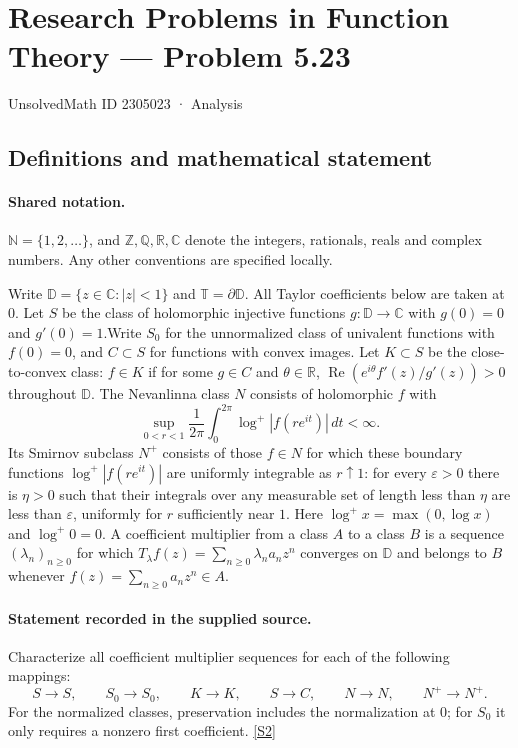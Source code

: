 \documentclass[11pt]{article}
\newcommand{\sref}[2]{\hyperlink{source:#1:#2}{[S#2]}}
\begin{document}
\setcounter{section}{2305022}
\section{Research Problems in Function Theory — Problem 5.23}\label{2305023}
{\small\sffamily UnsolvedMath ID 2305023 · Analysis}
\subsection{Definitions and mathematical statement}

\paragraph{Shared notation.}$\mathbb N=\{1,2,\ldots\}$, and $\mathbb Z,\mathbb Q,\mathbb R,\mathbb C$ denote the integers, rationals, reals and complex numbers. Any other conventions are specified locally.


Write $\mathbb D=\{z\in\mathbb C:|z|<1\}$ and $\mathbb T=\partial\mathbb D$. All Taylor coefficients below are taken at $0$. Let $S$ be the class of holomorphic injective functions $g:\mathbb D\to\mathbb C$ with $g(0)=0$ and $g'(0)=1$.Write $S_0$ for the unnormalized class of univalent functions with $f(0)=0$, and $C\subset S$ for functions with convex images. Let $K\subset S$ be the close-to-convex class: $f\in K$ if for some $g\in C$ and $\theta\in\mathbb R$, $\operatorname{Re}(e^{i\theta}f'(z)/g'(z))>0$ throughout $\mathbb D$. The Nevanlinna class $N$ consists of holomorphic $f$ with
\[\sup_{0<r<1}\frac1{2\pi}\int_0^{2\pi}\log^+|f(re^{it})|\,dt<\infty.
\]
Its Smirnov subclass $N^+$ consists of those $f\in N$ for which these boundary functions $\log^+|f(re^{it})|$ are uniformly integrable as $r\uparrow1$: for every $\varepsilon>0$ there is $\eta>0$ such that their integrals over any measurable set of length less than $\eta$ are less than $\varepsilon$, uniformly for $r$ sufficiently near $1$. Here $\log^+x=\max(0,\log x)$ and $\log^+0=0$. A coefficient multiplier from a class $A$ to a class $B$ is a sequence $(\lambda_n)_{n\ge0}$ for which $T_\lambda f(z)=\sum_{n\ge0}\lambda_n a_nz^n$ converges on $\mathbb D$ and belongs to $B$ whenever $f(z)=\sum_{n\ge0}a_nz^n\in A$.
\paragraph{Statement recorded in the supplied source.}
Characterize all coefficient multiplier sequences for each of the following mappings:
\[S\to S,\qquad S_0\to S_0,\qquad K\to K,\qquad S\to C,\qquad N\to N,\qquad N^+\to N^+.
\]
For the normalized classes, preservation includes the normalization at $0$; for $S_0$ it only requires a nonzero first coefficient. \sref{2305023}{2}
\end{document}
